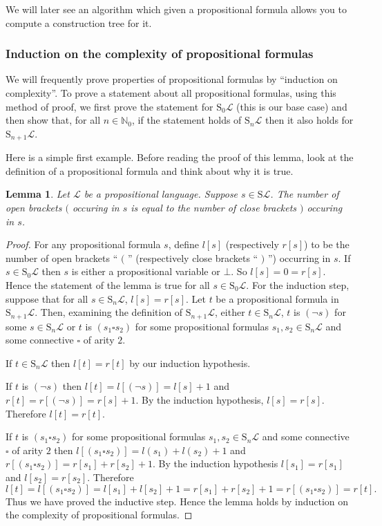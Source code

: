 \documentclass[11pt]{article}
\newcommand{\PF}{\mathrm{S}}
\newtheorem{lemma}[theorem]{Lemma}
\newcommand{\mcal}[1]{\mathcal{#1}}
\newcommand{\N}{\mathbb{N}}
\begin{document}
We will later see an algorithm which given a propositional formula allows you to compute a construction tree for it.


\subsubsection*{Induction on the complexity of propositional formulas}

We will frequently prove properties of propositional formulas by ``induction on complexity''. To prove a statement about all propositional formulas, using this method of proof, we first prove the statement for $\PF_0\mcal{L}$ (this is our base case) and then show that, for all $n\in\N_0$, if the statement holds of $\PF_n\mcal{L}$ then it also holds for $\PF_{n+1}\mcal{L}$.

Here is a simple first example. Before reading the proof of this lemma, look at the definition of a propositional formula and think about why it is true.
\begin{lemma}\label{leftrightbrackets}
Let $\mcal{L}$ be a propositional language. Suppose $s\in \PF\mcal{L}$. The number of open brackets $($ occuring in $s$ is equal to the number of close brackets $)$ occuring in $s$.
\end{lemma}
\begin{proof}
For any propositional formula $s$, define $l[s]$ (respectively $r[s]$) to be the number of open brackets `` $($ '' (respectively close brackets `` $)$ '') occurring in $s$. If $s\in \PF_0\mcal{L}$ then $s$ is either a propositional variable or $\bot$. So $l[s]=0=r[s]$. Hence the statement of the lemma is true for all $s\in \PF_0\mcal{L}$. For the induction step, suppose that for all $s\in \PF_n\mcal{L}$, $l[s]=r[s]$. Let $t$ be a propositional formula in $\PF_{n+1}\mcal{L}$. Then, examining the definition of $\PF_{n+1}\mcal{L}$, either $t\in \PF_n\mcal{L}$, $t$ is $(\neg s)$ for some $s\in \PF_n\mcal{L}$ or $t$ is $(s_1\square s_2)$ for some propositional formulas $s_1,s_2\in \PF_n\mcal{L}$ and some connective $\square$ of arity $2$.

If $t\in \PF_n\mcal{L}$ then $l[t]=r[t]$ by our induction hypothesis.

If $t$ is $(\neg s)$ then $l[t]=l[(\neg s)]=l[s]+1$ and $r[t]=r[(\neg s)]=r[s]+1$. By the induction hypothesis, $l[s]=r[s]$. Therefore $l[t]=r[t]$.

If $t$ is $(s_1\square s_2)$ for some propositional formulas $s_1,s_2\in \PF_n\mcal{L}$ and some connective $\square$ of arity $2$ then $l[(s_1\square s_2)]=l(s_1)+l(s_2)+1$ and $r[(s_1\square s_2)]=r[s_1]+r[s_2]+1$. By the induction hypothesis $l[s_1]=r[s_1]$ and $l[s_2]=r[s_2]$. Therefore \[l[t]=l[(s_1\square s_2)]=l[s_1]+l[s_2]+1=r[s_1]+r[s_2]+1=r[(s_1\square s_2)]=r[t].\] Thus we have proved the inductive step. Hence the lemma holds by induction on the complexity of propositional formulas.
\end{proof}
\end{document}

